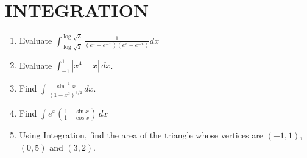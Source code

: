 \documentclass{article}
\begin{document}
\section{INTEGRATION}
\begin{enumerate}
    \item  Evaluate  $\int_{\log \sqrt{2}}^{\log \sqrt{3}} \frac{1}{(e^x + e^{-x})(e^x - e^{-x})}dx$
    \item  Evaluate $\int_{-1}^{1} |x^4 - x| \, dx$.
    \item  Find $\int \frac{\sin^{-1} x}{(1 - x^2)^{3/2}} \, dx$.
    \item Find $\int e^x(\frac{ 1 - \sin x}{1 - \cos x}) \, dx$
    \item  Using Integration, find the area of the triangle whose vertices are $(-1, 1)$, $(0, 5)$ and $(3, 2)$.
\end{enumerate}
\end{document}
